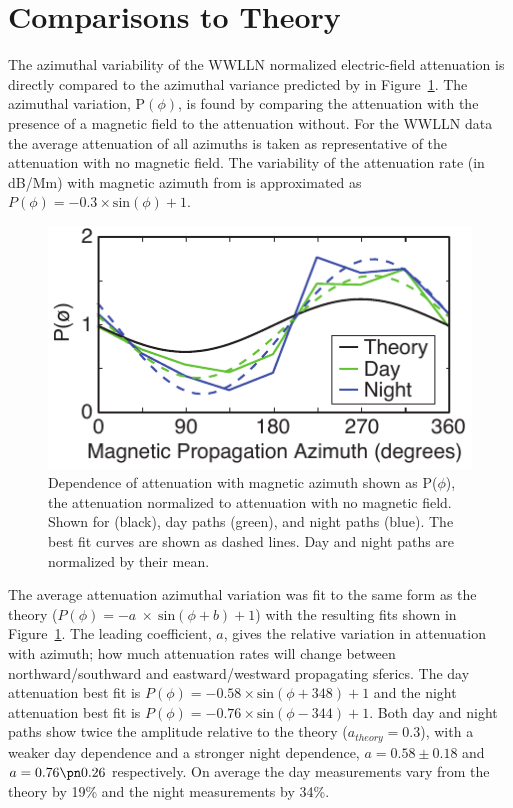 \section{Comparisons to Theory}

The azimuthal variability of the WWLLN normalized electric-field attenuation is directly compared to the azimuthal variance predicted by \citet{Wait1960a} in Figure~\ref{azimuth:fig:attenuationTheory}.
The azimuthal variation, P$(\phi)$, is found by comparing the attenuation with the presence of a magnetic field to the attenuation without.
For the WWLLN data the average attenuation of all azimuths is taken as representative of the attenuation with no magnetic field.
The variability of the attenuation rate (in dB/Mm) with magnetic azimuth from \citet{Wait1960a} is approximated as $P(\phi) = - 0.3 \times \text{sin}(\phi) + 1$.


\begin{figure}[h!t]
   \centering
   \includegraphics[scale=1]{Azimuth/Figures/attenuationTheory.pdf} 
   \caption{Dependence of attenuation with magnetic azimuth shown as P($\phi$), the attenuation normalized to attenuation with no magnetic field.
   	Shown for \citet{Wait1960a} (black), day paths (green), and night paths (blue).
	The best fit curves are shown as dashed lines.
	Day and night paths are normalized by their mean.}
   \label{azimuth:fig:attenuationTheory}
\end{figure}

The average attenuation azimuthal variation was fit to the same form as the theory ($P(\phi) = - a~\times~\text{sin}(\phi + b) + 1$) with the resulting fits shown in Figure~\ref{azimuth:fig:attenuationTheory}.
The leading coefficient, $a$, gives the relative variation in attenuation with azimuth; how much attenuation rates will change between northward/southward and eastward/westward propagating sferics.
The day attenuation best fit is $P(\phi) = - 0.58 \times \text{sin}(\phi + 348) + 1$ and the night attenuation best fit is $P(\phi) = - 0.76 \times \text{sin}(\phi - 344) + 1$.
Both day and night paths show twice the amplitude relative to the theory ($a_{theory} = 0.3$), with a weaker day dependence and a stronger night dependence, $a=0.58 \pm 0.18$ and $a=0.76 \pn 0.26$ respectively.
On average the day measurements vary from the theory by 19\% and the night measurements by 34\%.

